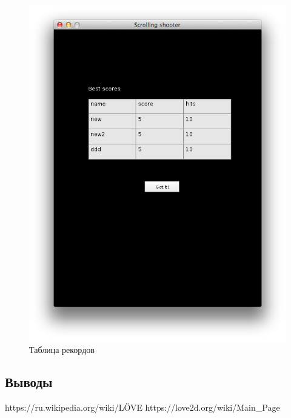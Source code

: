 \documentclass[12pt]{article}
\begin{document}
\begin{figure}[!htb]
  \centering
    \includegraphics[scale=0.5]{pics/records.png}
   \caption{Таблица рекордов}
    \label{fig:start}
\end{figure}

\subsection*{Выводы}

\begin{thebibliography}{}
 https://ru.wikipedia.org/wiki/LÖVE
 https://love2d.org/wiki/Main\_Page
\end{thebibliography}
\end{document}
